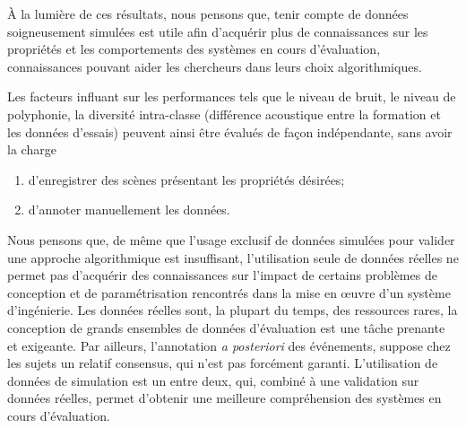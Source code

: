 À la lumière de ces résultats, nous pensons que, tenir compte de données soigneusement simulées est utile afin d'acquérir plus de connaissances sur les propriétés et les comportements des systèmes en cours d'évaluation, connaissances pouvant aider les chercheurs dans leurs choix algorithmiques. 

Les facteurs influant sur les performances tels que le niveau de bruit, le niveau de polyphonie, la diversité intra-classe (différence acoustique entre la formation et les données d'essais) peuvent ainsi être évalués de façon indépendante, sans avoir la charge 

\begin{enumerate}
\item d'enregistrer des scènes présentant les propriétés désirées;
\item d'annoter manuellement les données.
\end{enumerate}

Nous pensons que, de même que l'usage exclusif de données simulées pour valider une approche algorithmique est insuffisant, l'utilisation seule de données réelles ne permet pas d'acquérir des connaissances sur l'impact de certains problèmes de conception et de paramétrisation rencontrés dans la mise en œuvre d'un système d'ingénierie. Les données réelles sont, la plupart du temps, des ressources rares, la conception  de grands ensembles de données d'évaluation est une tâche prenante et exigeante. Par ailleurs, l'annotation \emph{a posteriori} des événements, suppose chez les sujets un relatif consensus, qui n'est pas forcément garanti. L'utilisation de données de simulation est un entre deux, qui, combiné à une validation sur données réelles, permet d'obtenir une meilleure compréhension des systèmes en cours d'évaluation. 





